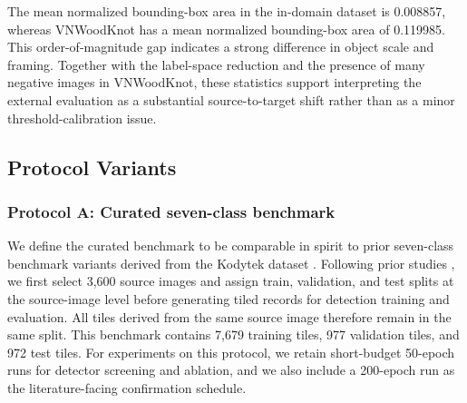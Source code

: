 \documentclass[cmc,article,submit,moreauthors,pdftex]{Definitions/tsp}
\begin{document}


The mean normalized bounding-box area in the in-domain dataset is 0.008857, whereas VNWoodKnot has a mean normalized bounding-box area of 0.119985. This order-of-magnitude gap indicates a strong difference in object scale and framing. Together with the label-space reduction and the presence of many negative images in VNWoodKnot, these statistics support interpreting the external evaluation as a substantial source-to-target shift rather than as a minor threshold-calibration issue.

\subsection{Protocol Variants}
\label{sec:protocol}

\subsubsection{Protocol A: Curated seven-class benchmark}
We define the curated benchmark to be comparable in spirit to prior seven-class benchmark variants derived from the Kodytek dataset \citep{kodytek_dataset}. Following prior studies \citep{odca_yolo,bpn_yolo,sim_yolo,fdd_yolo,an_cwb_yolov8}, we first select 3,600 source images and assign train, validation, and test splits at the source-image level before generating tiled records for detection training and evaluation. All tiles derived from the same source image therefore remain in the same split. This benchmark contains 7,679 training tiles, 977 validation tiles, and 972 test tiles. For experiments on this protocol, we retain short-budget 50-epoch runs for detector screening and ablation, and we also include a 200-epoch run as the literature-facing confirmation schedule.
\end{document}
